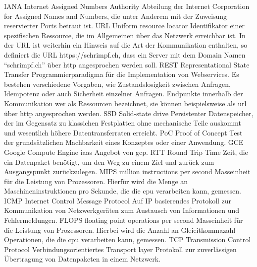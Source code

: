   {IANA}               %
  {Internet Assigned Numbers Authority}
  {Abteilung der Internet Corporation for Assigned Names and Numbers, die unter Anderem mit der Zuweisung reservierter Ports betraut ist.}
  {URL}               %
  {Uniform resource locator}
  {Identifikator einer spezifischen Ressource, die im Allgemeinen über das Netzwerk erreichbar ist. In der URL ist weiterhin ein Hinweis auf die Art der Kommunikation enthalten, so definiert die URL https://schrimpf.ch, dass ein Server mit dem Domain Namen "`schrimpf.ch"' über \gls{http} angesprochen werden soll.}
  {REST}               %
  {Representational State Transfer}
  {Programmierparadigma für die Implementation von Webservices. Es bestehen verschiedene Vorgaben, wie Zustandslosigkeit zwischen Anfragen, Idempotenz oder auch Sicherheit einzelner Anfragen. Endpunkte innerhalb der Kommunikation wer als Ressourcen bezeichnet, sie können beispielsweise als \gls{url} über \gls{http} angesprochen werden.}
  {SSD}               %
  {Solid-state drive}
  {Persistenter Datenspeicher, der im Gegensatz zu klassichen Festplatten ohne mechanische Teile auskommt und wesentlich höhere Datentransferraten erreicht.}
  {PoC}               %
  {Proof of Concept}
  {Test der grundsätzlichen Machbarkeit eines Konzeptes oder einer Anwendung.}
  {GCE}
  {Google Compute Engine}
  {\gls{iaas} Angebot von \gls{gcp}.}
  {RTT}
  {Round Trip Time}
  {Zeit, die ein Datenpaket benötigt, um den Weg zu einem Ziel und zurück zum Ausgangspunkt zurückzulegen.}
  {MIPS}
  {million instructions per second}
  {Masseinheit für die Leistung von Prozessoren. Hierfür wird die Menge an Maschineninstruktionen pro Sekunde, die die \gls{cpu} verarbeiten kann, gemessen.}
  {ICMP}
  {Internet Control Message Protocol}
  {Auf IP basierendes Protokoll zur Kommunikation von Netzwerkgeräten zum Austausch von Informationen und Fehlermeldungen.}
  {FLOPS}
  {floating point operations per second}
  {Masseinheit für die Leistung von Prozessoren. Hierbei wird die Anzahl an Gleieitkommazahl Operationen, die die \gls{cpu} verarbeiten kann, gemessen.}
  {TCP}
  {Transmission Control Protocol}
  {Verbindungsorientiertes Transport layer Protokoll zur zuverlässigen Übertragung von Datenpaketen in einem Netzwerk.}
